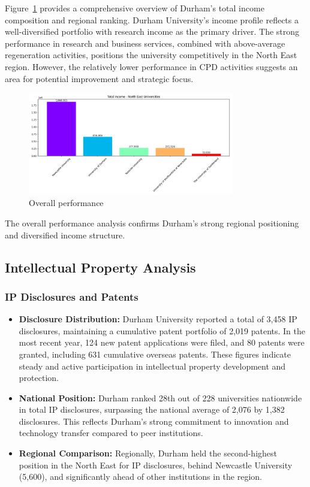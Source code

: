 \documentclass[journal,onecolumn, 10pt,draftclsnofoot]{IEEEtran}
\begin{document}
Figure~\ref{fig:overall-performance} provides a comprehensive overview of Durham's total income composition and regional ranking. Durham University's income profile reflects a well-diversified portfolio with research income as the primary driver. The strong performance in research and business services, combined with above-average regeneration activities, positions the university competitively in the North East region. However, the relatively lower performance in CPD activities suggests an area for potential improvement and strategic focus.

\begin{figure}[h]
\centering
\includegraphics[width=0.8\textwidth]{Fig/figure17._overall_performance.png}
\caption{Overall performance}
\label{fig:overall-performance}
\end{figure}

The overall performance analysis confirms Durham's strong regional positioning and diversified income structure.

\subsection{Intellectual Property Analysis}

\subsubsection{IP Disclosures and Patents}

\begin{itemize}
    \item \textbf{Disclosure Distribution:} Durham University reported a total of 3,458 IP disclosures, maintaining a cumulative patent portfolio of 2,019 patents. In the most recent year, 124 new patent applications were filed, and 80 patents were granted, including 631 cumulative overseas patents. These figures indicate steady and active participation in intellectual property development and protection.
    
    \item \textbf{National Position:} Durham ranked 28th out of 228 universities nationwide in total IP disclosures, surpassing the national average of 2,076 by 1,382 disclosures. This reflects Durham's strong commitment to innovation and technology transfer compared to peer institutions.
    
    \item \textbf{Regional Comparison:} Regionally, Durham held the second-highest position in the North East for IP disclosures, behind Newcastle University (5,600), and significantly ahead of other institutions in the region.
\end{itemize}
\end{document}
